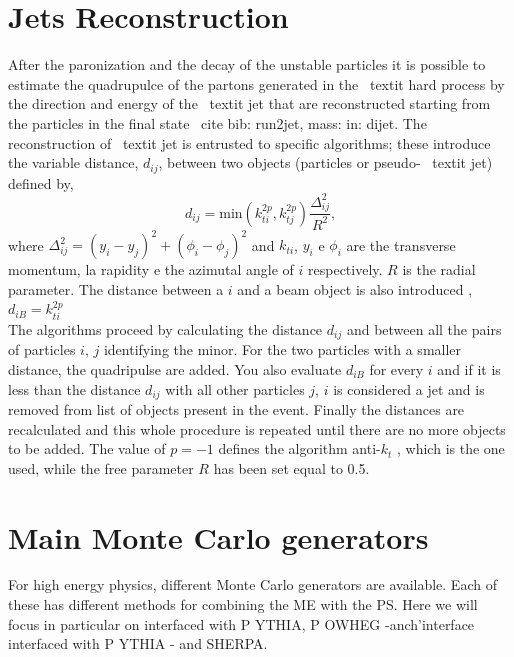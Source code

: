 \section{Jets Reconstruction } 
\label{rico_jet}
After the paronization and the decay of the unstable particles it is possible to estimate the quadrupulce of the partons generated in the \ textit {hard process} by the direction and energy of the \ textit {jet} that are reconstructed starting from the particles in the final state \ cite {bib: run2jet, mass: in: dijet}.
The reconstruction of \ textit {jet} is entrusted to specific algorithms; these introduce the variable distance, $ d_ {ij} $, between two objects (particles or pseudo- \ textit {jet}) defined by,
\begin{equation}
d_{ij}=\mbox{min}( k_{ti}^{2p}, k_{tj}^{2p})  \frac{\Delta_{ij}^2}{R^2} \mbox{,}\end{equation}
where $\Delta_{ij}^2=(y_i - y_j)^2+ (\phi_i - \phi_j)^2$ and $k_{ti}$, $y_i$ e $\phi_i$ are  the transverse momentum, la rapidity  e the azimutal angle of $i$ respectively.  $R$ is the radial parameter. The distance between a $ i $ and a beam object is also introduced , $d_{iB}=k_{ti}^{2p}$ \\

The algorithms proceed by calculating the distance $ d_{ij} $ and between all the pairs of particles $ i $, $ j $ identifying the minor. For the two particles with a smaller distance, the quadripulse are added. You also evaluate $ d_{iB} $ for every $ i $ and if it is less than the distance $ d_{ij} $ with all other particles $ j $, $ i $ is considered a jet and is removed from list of objects present in the event.
Finally the distances are recalculated and this whole procedure is repeated until there are no more objects to be added.
The value of $ p = -1 $ defines the algorithm anti-$k_t $ \cite{Cacciari: 2008gp}, which is the one used, while the free parameter $ R $ has been set equal to 0.5.




\section{Main Monte Carlo generators }
For high energy physics, different Monte Carlo generators are available. Each of these has different methods for combining the ME with the PS.
Here we will focus in particular on \aMC interfaced with P {\footnotesize YTHIA}, P {\footnotesize OWHEG} -anch'interface interfaced with P {\footnotesize YTHIA} - and S{\footnotesize HERPA}. 
 
